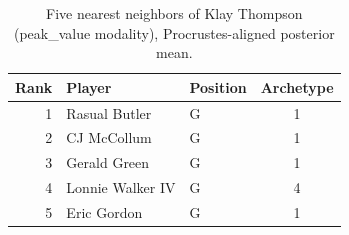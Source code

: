 \begin{table}[htbp]
  \centering\small
  \begin{tabular}{rllc}
    \toprule
    Rank & Player & Position & Archetype \\
    \midrule
    1 & Rasual Butler & G & 1 \\
    2 & CJ McCollum & G & 1 \\
    3 & Gerald Green & G & 1 \\
    4 & Lonnie Walker IV & G & 4 \\
    5 & Eric Gordon & G & 1 \\
    \bottomrule
  \end{tabular}
  \caption{Five nearest neighbors of Klay Thompson (peak_value modality), Procrustes-aligned posterior mean.}
  \label{tab:Klay_Thompson_neighbors_peak_value}
\end{table}

